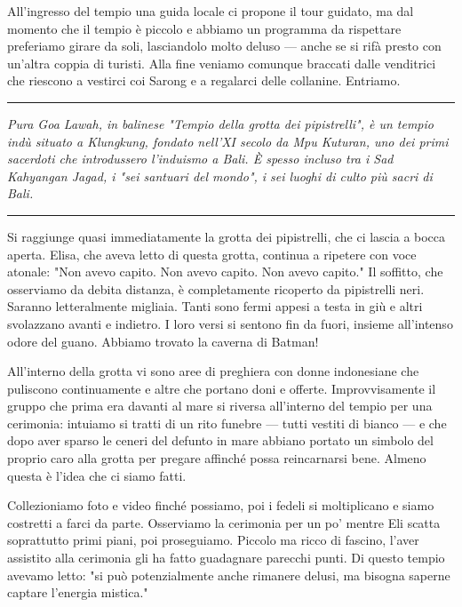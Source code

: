 All'ingresso del tempio una guida locale ci propone il tour guidato, ma dal momento che il tempio è piccolo e abbiamo un programma da rispettare preferiamo girare da soli, lasciandolo molto deluso — anche se si rifà presto con un'altra coppia di turisti. Alla fine veniamo comunque braccati dalle venditrici che riescono a vestirci coi Sarong e a regalarci delle collanine. Entriamo.

\begin{center}
    \noindent\rule{0.6\textwidth}{0.4pt}
\end{center}

\textit{Pura Goa Lawah, in balinese "Tempio della grotta dei pipistrelli", è un tempio indù situato a Klungkung, fondato nell'XI secolo da Mpu Kuturan, uno dei primi sacerdoti che introdussero l'induismo a Bali. È spesso incluso tra i Sad Kahyangan Jagad, i "sei santuari del mondo", i sei luoghi di culto più sacri di Bali.}

\begin{center}
    \noindent\rule{0.6\textwidth}{0.4pt}
\end{center}

Si raggiunge quasi immediatamente la grotta dei pipistrelli, che ci lascia a bocca aperta. Elisa, che aveva letto di questa grotta, continua a ripetere con voce atonale: "Non avevo capito. Non avevo capito. Non avevo capito." Il soffitto, che osserviamo da debita distanza, è completamente ricoperto da pipistrelli neri. Saranno letteralmente migliaia. Tanti sono fermi appesi a testa in giù e altri svolazzano avanti e indietro. I loro versi si sentono fin da fuori, insieme all'intenso odore del guano. Abbiamo trovato la caverna di Batman!

All'interno della grotta vi sono aree di preghiera con donne indonesiane che puliscono continuamente e altre che portano doni e offerte. Improvvisamente il gruppo che prima era davanti al mare si riversa all'interno del tempio per una cerimonia: intuiamo si tratti di un rito funebre — tutti vestiti di bianco — e che dopo aver sparso le ceneri del defunto in mare abbiano portato un simbolo del proprio caro alla grotta per pregare affinché possa reincarnarsi bene. Almeno questa è l'idea che ci siamo fatti.

Collezioniamo foto e video finché possiamo, poi i fedeli si moltiplicano e siamo costretti a farci da parte. Osserviamo la cerimonia per un po' mentre Eli scatta soprattutto primi piani, poi proseguiamo. Piccolo ma ricco di fascino, l'aver assistito alla cerimonia gli ha fatto guadagnare parecchi punti. Di questo tempio avevamo letto: "si può potenzialmente anche rimanere delusi, ma bisogna saperne captare l'energia mistica."

